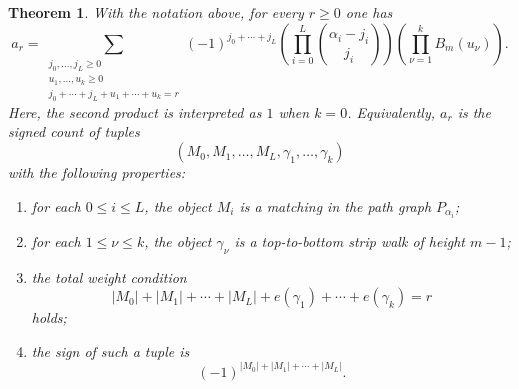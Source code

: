 \documentclass[12pt]{amsart}
\newtheorem{theorem}{Theorem}
\theoremstyle{definition}
\theoremstyle{remark}
\begin{document}
\begin{theorem}\label{thm:comb}
With the notation above, for every $r\ge 0$ one has
\[
a_r=
\sum_{\substack{j_0,\dots,j_L\ge 0\\ u_1,\dots,u_k\ge 0\\
 j_0+\cdots+j_L+u_1+\cdots+u_k=r}}
(-1)^{j_0+\cdots+j_L}
\left(\prod_{i=0}^L \binom{\alpha_i-j_i}{j_i}\right)
\left(\prod_{\nu=1}^k B_m(u_\nu)\right).
\]
Here, the second product is interpreted as $1$ when $k=0$.
Equivalently, $a_r$ is the signed count of tuples
\[
(M_0,M_1,\dots,M_L,\gamma_1,\dots,\gamma_k)
\]
with the following properties:
\begin{enumerate}
\item for each $0\le i\le L$, the object $M_i$ is a matching in the path graph $P_{\alpha_i}$;
\item for each $1\le \nu\le k$, the object $\gamma_\nu$ is a top-to-bottom strip walk of height $m-1$;
\item the total weight condition
\[
|M_0|+|M_1|+\cdots+|M_L|+e(\gamma_1)+\cdots+e(\gamma_k)=r
\]
holds;
\item the sign of such a tuple is
\[
(-1)^{|M_0|+|M_1|+\cdots+|M_L|}.
\]
\end{enumerate}
\end{theorem}
\end{document}
